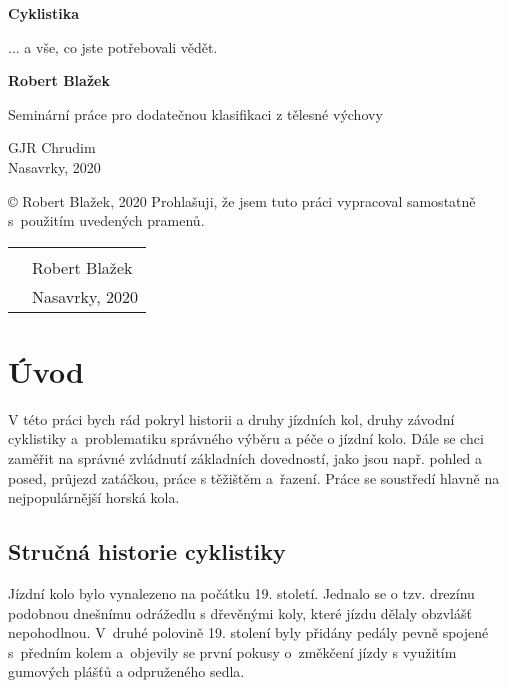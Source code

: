 \documentclass[11pt]{article}
\begin{document}
\begin{titlepage}
    \begin{center}
        \vspace*{1cm}

        \Huge
        \textbf{{Cyklistika}}

        \vspace{0.5cm}
        ... a vše, co jste potřebovali vědět.

        \vspace{1.5cm}

        \large
        \textbf{Robert Blažek}
        
        \vfill

        Seminární práce pro dodatečnou klasifikaci z tělesné výchovy

        \vspace{0.8cm}
        GJR Chrudim\\
        Nasavrky, 2020
    \end{center}
\end{titlepage}

\vspace*{\fill}
\noindent © Robert Blažek, 2020
\newline \newline
Prohlašuji, že jsem tuto práci vypracoval samostatně s~použitím uvedených pramenů.
\newline \newline \newline \newline 
\begin{tabular}{@{}p{0in}p{4in}@{}}
    & \hrulefill \\
    & Robert Blažek \\
    & Nasavrky, 2020\\
    \end{tabular}
\newpage
\tableofcontents
\newpage

\section{Úvod}
V této práci bych rád pokryl historii a druhy jízdních kol, druhy závodní cyklistiky a~problematiku správného výběru a péče o jízdní kolo. Dále se chci zaměřit na správné zvládnutí základních dovedností, jako jsou např. pohled a posed, průjezd zatáčkou, práce s těžištěm a~řazení. Práce se soustředí hlavně na nejpopulárnější horská kola.
\subsection[Stručná historie]{Stručná historie cyklistiky}
Jízdní kolo bylo vynalezeno na počátku 19. století. Jednalo se o tzv. drezínu podobnou dnešnímu odrážedlu s dřevěnými koly, které jízdu dělaly obzvlášť nepohodlnou. V~druhé polovině 19. stolení byly přidány pedály pevně spojené s~předním kolem a~objevily se první pokusy o~změkčení jízdy s využitím gumových plášťů a odpruženého sedla.
\end{document}
